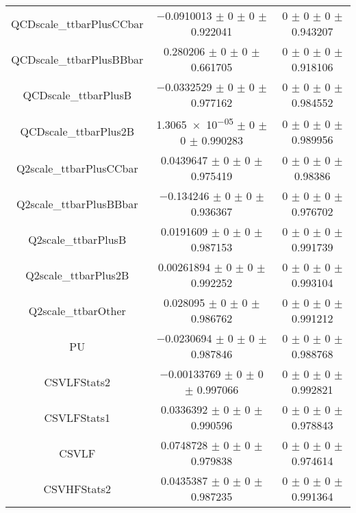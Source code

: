 \begin{table}
\begin{tabular}{ccc}
QCDscale\_ttbarPlusCCbar & \num{-0.0910013} $\pm$ \num{0} $\pm$ \num{0} $\pm$ \num{0.922041} & \num{0} $\pm$ \num{0} $\pm$ \num{0} $\pm$ \num{0.943207}\\
QCDscale\_ttbarPlusBBbar & \num{0.280206} $\pm$ \num{0} $\pm$ \num{0} $\pm$ \num{0.661705} & \num{0} $\pm$ \num{0} $\pm$ \num{0} $\pm$ \num{0.918106}\\
QCDscale\_ttbarPlusB & \num{-0.0332529} $\pm$ \num{0} $\pm$ \num{0} $\pm$ \num{0.977162} & \num{0} $\pm$ \num{0} $\pm$ \num{0} $\pm$ \num{0.984552}\\
QCDscale\_ttbarPlus2B & \num{1.3065e-05} $\pm$ \num{0} $\pm$ \num{0} $\pm$ \num{0.990283} & \num{0} $\pm$ \num{0} $\pm$ \num{0} $\pm$ \num{0.989956}\\
Q2scale\_ttbarPlusCCbar & \num{0.0439647} $\pm$ \num{0} $\pm$ \num{0} $\pm$ \num{0.975419} & \num{0} $\pm$ \num{0} $\pm$ \num{0} $\pm$ \num{0.98386}\\
Q2scale\_ttbarPlusBBbar & \num{-0.134246} $\pm$ \num{0} $\pm$ \num{0} $\pm$ \num{0.936367} & \num{0} $\pm$ \num{0} $\pm$ \num{0} $\pm$ \num{0.976702}\\
Q2scale\_ttbarPlusB & \num{0.0191609} $\pm$ \num{0} $\pm$ \num{0} $\pm$ \num{0.987153} & \num{0} $\pm$ \num{0} $\pm$ \num{0} $\pm$ \num{0.991739}\\
Q2scale\_ttbarPlus2B & \num{0.00261894} $\pm$ \num{0} $\pm$ \num{0} $\pm$ \num{0.992252} & \num{0} $\pm$ \num{0} $\pm$ \num{0} $\pm$ \num{0.993104}\\
Q2scale\_ttbarOther & \num{0.028095} $\pm$ \num{0} $\pm$ \num{0} $\pm$ \num{0.986762} & \num{0} $\pm$ \num{0} $\pm$ \num{0} $\pm$ \num{0.991212}\\
PU & \num{-0.0230694} $\pm$ \num{0} $\pm$ \num{0} $\pm$ \num{0.987846} & \num{0} $\pm$ \num{0} $\pm$ \num{0} $\pm$ \num{0.988768}\\
CSVLFStats2 & \num{-0.00133769} $\pm$ \num{0} $\pm$ \num{0} $\pm$ \num{0.997066} & \num{0} $\pm$ \num{0} $\pm$ \num{0} $\pm$ \num{0.992821}\\
CSVLFStats1 & \num{0.0336392} $\pm$ \num{0} $\pm$ \num{0} $\pm$ \num{0.990596} & \num{0} $\pm$ \num{0} $\pm$ \num{0} $\pm$ \num{0.978843}\\
CSVLF & \num{0.0748728} $\pm$ \num{0} $\pm$ \num{0} $\pm$ \num{0.979838} & \num{0} $\pm$ \num{0} $\pm$ \num{0} $\pm$ \num{0.974614}\\
CSVHFStats2 & \num{0.0435387} $\pm$ \num{0} $\pm$ \num{0} $\pm$ \num{0.987235} & \num{0} $\pm$ \num{0} $\pm$ \num{0} $\pm$ \num{0.991364}\\

\end{tabular}
\end{table}
